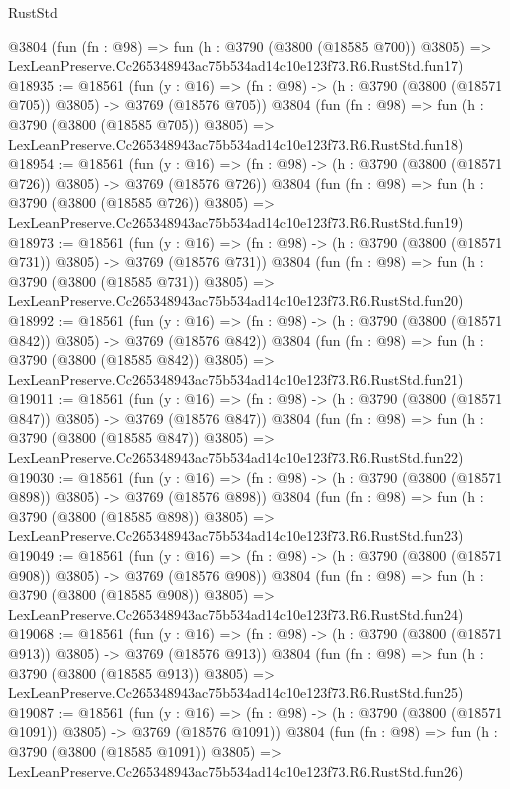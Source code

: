 \begin{lexlean}{RustStd}
\begin{coremodule}
    @3804
    (fun (fn : @98) =>
    fun (h : @3790 (@3800 (@18585 @700)) @3805) =>
    LexLeanPreserve.Cc265348943ac75b534ad14c10e123f73.R6.RustStd.fun17)
@18935 := @18561
    (fun (y : @16) => (fn : @98) -> (h : @3790 (@3800 (@18571 @705)) @3805) -> @3769 (@18576 @705))
    @3804
    (fun (fn : @98) =>
    fun (h : @3790 (@3800 (@18585 @705)) @3805) =>
    LexLeanPreserve.Cc265348943ac75b534ad14c10e123f73.R6.RustStd.fun18)
@18954 := @18561
    (fun (y : @16) => (fn : @98) -> (h : @3790 (@3800 (@18571 @726)) @3805) -> @3769 (@18576 @726))
    @3804
    (fun (fn : @98) =>
    fun (h : @3790 (@3800 (@18585 @726)) @3805) =>
    LexLeanPreserve.Cc265348943ac75b534ad14c10e123f73.R6.RustStd.fun19)
@18973 := @18561
    (fun (y : @16) => (fn : @98) -> (h : @3790 (@3800 (@18571 @731)) @3805) -> @3769 (@18576 @731))
    @3804
    (fun (fn : @98) =>
    fun (h : @3790 (@3800 (@18585 @731)) @3805) =>
    LexLeanPreserve.Cc265348943ac75b534ad14c10e123f73.R6.RustStd.fun20)
@18992 := @18561
    (fun (y : @16) => (fn : @98) -> (h : @3790 (@3800 (@18571 @842)) @3805) -> @3769 (@18576 @842))
    @3804
    (fun (fn : @98) =>
    fun (h : @3790 (@3800 (@18585 @842)) @3805) =>
    LexLeanPreserve.Cc265348943ac75b534ad14c10e123f73.R6.RustStd.fun21)
@19011 := @18561
    (fun (y : @16) => (fn : @98) -> (h : @3790 (@3800 (@18571 @847)) @3805) -> @3769 (@18576 @847))
    @3804
    (fun (fn : @98) =>
    fun (h : @3790 (@3800 (@18585 @847)) @3805) =>
    LexLeanPreserve.Cc265348943ac75b534ad14c10e123f73.R6.RustStd.fun22)
@19030 := @18561
    (fun (y : @16) => (fn : @98) -> (h : @3790 (@3800 (@18571 @898)) @3805) -> @3769 (@18576 @898))
    @3804
    (fun (fn : @98) =>
    fun (h : @3790 (@3800 (@18585 @898)) @3805) =>
    LexLeanPreserve.Cc265348943ac75b534ad14c10e123f73.R6.RustStd.fun23)
@19049 := @18561
    (fun (y : @16) => (fn : @98) -> (h : @3790 (@3800 (@18571 @908)) @3805) -> @3769 (@18576 @908))
    @3804
    (fun (fn : @98) =>
    fun (h : @3790 (@3800 (@18585 @908)) @3805) =>
    LexLeanPreserve.Cc265348943ac75b534ad14c10e123f73.R6.RustStd.fun24)
@19068 := @18561
    (fun (y : @16) => (fn : @98) -> (h : @3790 (@3800 (@18571 @913)) @3805) -> @3769 (@18576 @913))
    @3804
    (fun (fn : @98) =>
    fun (h : @3790 (@3800 (@18585 @913)) @3805) =>
    LexLeanPreserve.Cc265348943ac75b534ad14c10e123f73.R6.RustStd.fun25)
@19087 := @18561
    (fun (y : @16) =>
    (fn : @98) -> (h : @3790 (@3800 (@18571 @1091)) @3805) -> @3769 (@18576 @1091))
    @3804
    (fun (fn : @98) =>
    fun (h : @3790 (@3800 (@18585 @1091)) @3805) =>
    LexLeanPreserve.Cc265348943ac75b534ad14c10e123f73.R6.RustStd.fun26)

\end{coremodule}
\end{lexlean}
